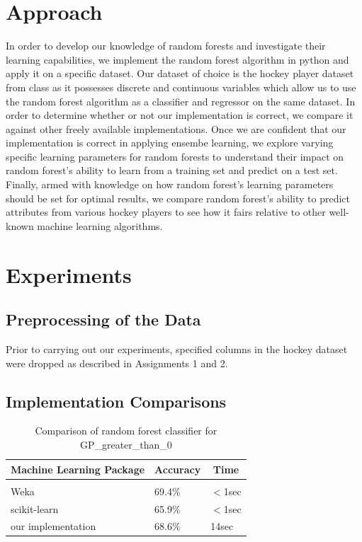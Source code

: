 \documentclass{article} %
\begin{document}
\section{Approach}

In order to develop our knowledge of random forests and investigate their learning capabilities, we implement the random forest algorithm in python and apply it on a specific dataset.  Our dataset of choice is the hockey player dataset from class as it possesses discrete and continuous variables which allow us to use the random forest algorithm as a classifier and regressor on the same dataset.  In order to determine whether or not our implementation is correct, we compare it against other freely available implementations.  Once we are confident that our implementation is correct in applying ensembe learning, we explore varying specific learning parameters for random forests to understand their impact on random forest's ability to learn from a training set and predict on a test set.  Finally, armed with knowledge on how random forest's learning parameters should be set for optimal results, we compare random forest's ability to predict attributes from various hockey players to see how it fairs relative to other well-known machine learning algorithms.


\section{Experiments}

\subsection{Preprocessing of the Data}
Prior to carrying out our experiments, specified columns in the hockey dataset were dropped as described in Assignments 1 and 2.

\subsection{Implementation Comparisons}

\begin{table}[h]
\caption{Comparison of random forest classifier for GP\_greater\_than\_0}
\label{clas-table}
\begin{center}
\begin{tabular}{lll}
\multicolumn{1}{c}{\bf Machine Learning Package} &\multicolumn{1}{c}{\bf Accuracy} &\multicolumn{1}{c}{\bf Time}
\\ \hline \\
Weka         &69.4\%	&$<$1sec \\
scikit-learn             &65.9\%	&$<$1sec \\
our implementation             &68.6\%	&14sec \\
\end{tabular}
\end{center}
\end{table}
\end{document}
